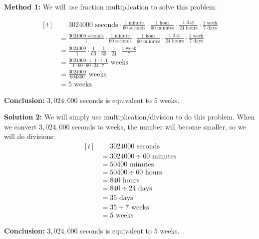\begin{solution}

\textbf{Method 1:} We will use fraction multiplication to solve this problem:

\[
\begin{aligned}[t]
	&\phantom{{}=}3024000 \text{ seconds} \cdot \frac{1 \text{ minute}}{60 \text{ seconds}} \cdot \frac{1 \text{ hour}}{60 \text{ minutes}} \cdot \frac{1 \text{ day}}{24 \text{ hours}} \cdot \frac{1 \text{ week}}{7 \text{ days}} \\
	&=\frac{3024000 \text{ seconds}}{1} \cdot \frac{1 \text{ minute}}{60 \text{ seconds}} \cdot \frac{1 \text{ hour}}{60 \text{ minutes}} \cdot \frac{1 \text{ day}}{24 \text{ hours}} \cdot \frac{1 \text{ week}}{7 \text{ days}} \\
	&=\frac{3024000}{1} \cdot \frac{1}{60} \cdot \frac{1}{60} \cdot \frac{1}{24} \cdot \frac{1 \text{ week}}{7} \\
	&= \frac{3024000 \cdot 1 \cdot 1 \cdot 1 \cdot 1}{1 \cdot 60 \cdot 60 \cdot 24 \cdot 7} \text{ weeks} \\
	&= \frac{3024000}{604800} \text{ weeks} \\
	&= 5 \text{ weeks}
\end{aligned}
\]

\textbf{Conclusion:} $3,024,000$ seconds is equivalent to $5$ weeks.

\textbf{Solution 2:} We will simply use multiplication/division to do this problem. When we convert $3,024,000$ seconds to weeks, the number will become smaller, so we will do divisions:
\[
\begin{aligned}[t]
	&\phantom{{}=} 3024000 \text{ seconds} \\
	&= 3024000 \div 60 \text{ minutes} \\
	&= 50400 \text{ minutes} \\
	&= 50400 \div 60 \text{ hours} \\
	&= 840 \text{ hours} \\
	&= 840 \div 24 \text{ days} \\
	&= 35 \text{ days} \\
	&= 35 \div 7 \text{ weeks} \\
	&= 5 \text{ weeks}
\end{aligned}
\]

\textbf{Conclusion:} $3,024,000$ seconds is equivalent to $5$ weeks.

\end{solution}

